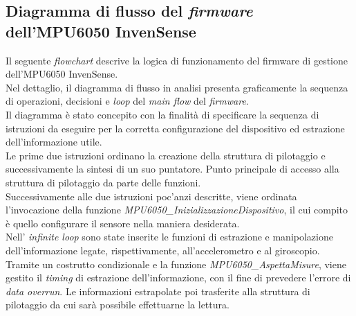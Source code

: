 \subsection{Diagramma di flusso del \textit{firmware} \\dell'MPU6050 InvenSense}
Il seguente \textit{flowchart} descrive la logica di funzionamento del firmware di gestione dell'MPU6050 InvenSense.\\
Nel dettaglio, il diagramma di flusso in analisi presenta graficamente la sequenza di operazioni, decisioni e \textit{loop} del \textit{main flow} del \textit{firmware}.\\
Il diagramma è stato concepito con la finalità di specificare la sequenza di istruzioni da eseguire per la corretta configurazione del dispositivo ed estrazione dell'informazione utile.\\
Le prime due istruzioni ordinano la creazione della struttura di pilotaggio e successivamente la sintesi di un suo puntatore. Punto principale di accesso alla struttura di pilotaggio da parte delle funzioni.\\
Successivamente alle due istruzioni poc'anzi descritte, viene ordinata l'invocazione della  funzione \textit{MPU6050\_InizializzazioneDispositivo}, il cui compito è quello configurare il sensore nella maniera desiderata.\\
Nell' \textit{infinite loop} sono state inserite le funzioni di estrazione e manipolazione dell'informazione legate, rispettivamente, all'accelerometro e al giroscopio.
Tramite un costrutto condizionale e la funzione \textit{MPU6050\_AspettaMisure}, viene gestito il \textit{timing} di estrazione dell'informazione, con il fine di prevedere l'errore di \textit{data overrun}.
Le informazioni estrapolate  poi trasferite alla struttura di pilotaggio da cui sarà possibile effettuarne la lettura.

